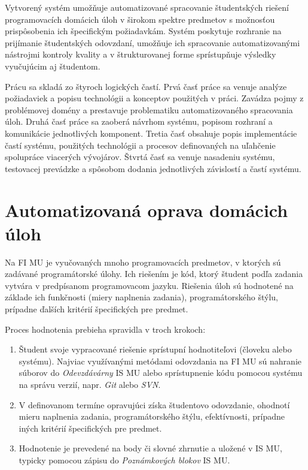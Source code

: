 \documentclass[
  digital, %
  twoside, %
  table,   %
  lof,     %
  lot,     %
]{fithesis3}
\begin{document}
Vytvorený systém umožňuje automatizované spracovanie študentských riešení programovacích domácich úloh v širokom spektre predmetov s možnosťou prispôsobenia ich špecifickým požiadavkám. Systém poskytuje rozhranie na prijímanie študentských odovzdaní, umožňuje ich spracovanie automatizovanými nástrojmi kontroly kvality a v štrukturovanej forme sprístupňuje výsledky vyučujúcim aj študentom.

Prácu sa skladá zo štyroch logických častí. Prvá časť práce sa venuje analýze požiadaviek a popisu technológii a konceptov použitých v práci. Zavádza pojmy z problémovej domény a prestavuje problematiku automatizovaného spracovania úloh. Druhá časť práce sa zaoberá návrhom systému, popisom rozhraní a komunikácie jednotlivých komponent. Tretia časť obsahuje popis implementácie častí systému, použitých technológii a procesov definovaných na uľahčenie spolupráce viacerých vývojárov. Štvrtá časť sa venuje nasadeniu systému, testovacej prevádzke a spôsobom dodania jednotlivých závislostí a častí systému. 

\chapter{Automatizovaná oprava domácich úloh}

Na FI MU je vyučovaných mnoho programovacích predmetov, v ktorých sú zadávané programátorské úlohy. Ich riešením je kód, ktorý študent podľa zadania vytvára v predpísanom programovacom jazyku. Riešenia úloh sú hodnotené na základe ich funkčnosti (miery naplnenia zadania), programátorského štýlu, prípadne ďalších kritérií špecifických pre predmet. 

Proces hodnotenia prebieha spravidla v troch krokoch:
\begin{enumerate}
    \item Študent svoje vypracované riešenie sprístupní hodnotiteľovi (človeku alebo systému). Najviac využívanými metódami odovzdania na FI MU sú nahranie súborov do \textit{Odevzdávárny} IS MU alebo sprístupnenie kódu pomocou systému na správu verzií, napr. \textit{Git} alebo \textit{SVN}. 
    \item V definovanom termíne opravujúci získa študentovo odovzdanie, ohodnotí mieru naplnenia zadania, programátorského štýlu, efektívnosti, prípadne iných kritérií špecifických pre predmet. 
    \item Hodnotenie je prevedené na body či slovné zhrnutie a uložené v IS MU, typicky pomocou zápisu do \textit{Poznámkových blokov} IS MU.
\end{enumerate}
\end{document}
